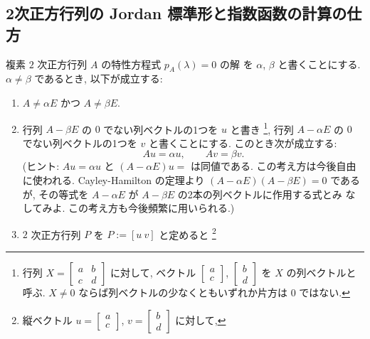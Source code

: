 \documentclass[12pt,twoside]{jarticle}
\begin{document}

\subsection{2次正方行列の Jordan 標準形と指数函数の計算の仕方}
\label{sec:2x2-Jordan}


\begin{question}\label{q:normal-form-2.1}
  複素 $2$ 次正方行列 $A$ の特性方程式 $p_A(\lambda)=0$ の解
  を $\alpha$, $\beta$ と書くことにする. 
  $\alpha \ne \beta$ であるとき, 以下が成立する:
  \begin{enumerate}
  \item[(1)] $A \ne \alpha E$ かつ $A \ne \beta E$.
  \item[(2)] 行列 $A - \beta E$ の $0$ でない列ベクトルの1つを $u$ と書き%
    \footnote{行列 $X=\begin{bmatrix}a&b\\c&d\end{bmatrix}$ に対して, 
      ベクトル $\begin{bmatrix}a\\c\end{bmatrix}$,
      $\begin{bmatrix}b\\d\end{bmatrix}$ を $X$ の列ベクトルと呼ぶ.
      $X \ne 0$ ならば列ベクトルの少なくともいずれか片方は $0$ ではない.}, %
    行列 $A - \alpha E$ の $0$ でない列ベクトルの1つを $v$ と書くことにする. 
    このとき次が成立する:
    \begin{equation*}
      Au = \alpha u,  \qquad  Av = \beta v.
    \end{equation*}
    (ヒント: $Au=\alpha u$ と $(A-\alpha E)u=$ は同値である.
    この考え方は今後自由に使われる. 
    Cayley-Hamilton の定理より $(A-\alpha E)(A-\beta E)=0$ であるが, 
    その等式を $A-\alpha E$ が $A-\beta E$ の2本の列ベクトルに作用する式とみ
    なしてみよ.  この考え方も今後頻繁に用いられる.)
  \item[(3)] $2$ 次正方行列 $P$ を $P := [u\ v]$ と定めると%
    \footnote{縦ベクトル $u=\begin{bmatrix}a\\c\end{bmatrix}$, 
      $v=\begin{bmatrix}b\\d\end{bmatrix}$ に対して, 
}
\end{enumerate}
\end{question}
\end{document}
